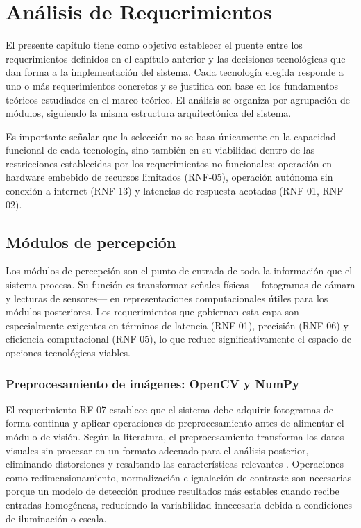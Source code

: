 \section{Análisis de Requerimientos}

El presente capítulo tiene como objetivo establecer el puente entre los requerimientos
definidos en el capítulo anterior y las decisiones tecnológicas que dan forma a la
implementación del sistema. Cada tecnología elegida responde a uno o más requerimientos
concretos y se justifica con base en los fundamentos teóricos estudiados en el marco
teórico. El análisis se organiza por agrupación de módulos, siguiendo la misma
estructura arquitectónica del sistema.

Es importante señalar que la selección no se basa únicamente en la capacidad funcional
de cada tecnología, sino también en su viabilidad dentro de las restricciones
establecidas por los requerimientos no funcionales: operación en hardware embebido
de recursos limitados (RNF-05), operación autónoma sin conexión a internet (RNF-13)
y latencias de respuesta acotadas (RNF-01, RNF-02).

\subsection{Módulos de percepción}

Los módulos de percepción son el punto de entrada de toda la información que el sistema
procesa. Su función es transformar señales físicas ---fotogramas de cámara y lecturas
de sensores--- en representaciones computacionales útiles para los módulos posteriores.
Los requerimientos que gobiernan esta capa son especialmente exigentes en términos de
latencia (RNF-01), precisión (RNF-06) y eficiencia computacional (RNF-05), lo que
reduce significativamente el espacio de opciones tecnológicas viables.

\subsubsection{Preprocesamiento de imágenes: OpenCV y NumPy}

El requerimiento RF-07 establece que el sistema debe adquirir fotogramas de forma
continua y aplicar operaciones de preprocesamiento antes de alimentar el módulo de
visión. Según la literatura, el preprocesamiento transforma los datos visuales sin
procesar en un formato adecuado para el análisis posterior, eliminando distorsiones y
resaltando las características relevantes \cite{unitxlabs_prepost}. Operaciones como
redimensionamiento, normalización e igualación de contraste son necesarias porque un
modelo de detección produce resultados más estables cuando recibe entradas homogéneas,
reduciendo la variabilidad innecesaria debida a condiciones de iluminación o escala.

